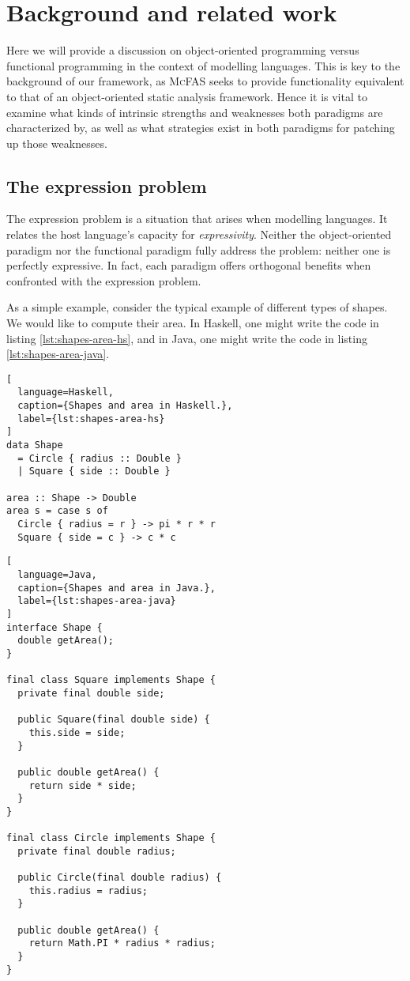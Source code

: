 \documentclass[letterpaper,11pt]{article}
\newcommand{\mcfas}{\textsc{McFAS}}
\begin{document}
\section{Background and related work}

Here we will provide a discussion on object-oriented programming versus
functional programming in the context of modelling languages. This is key to
the background of our framework, as \mcfas{} seeks to provide functionality
equivalent to that of an object-oriented static analysis framework. Hence it is
vital to examine what kinds of intrinsic strengths and weaknesses both
paradigms are characterized by, as well as what strategies exist in both
paradigms for patching up those weaknesses.

\subsection{The expression problem} \label{sec:expr}

The expression problem\cite{Wadler1998} is a situation that arises when
modelling languages. It relates the host language's capacity for
\emph{expressivity}. Neither the object-oriented paradigm nor the functional
paradigm fully address the problem: neither one is perfectly expressive. In
fact, each paradigm offers orthogonal benefits when confronted with the
expression problem.

As a simple example, consider the typical example of different types of shapes.
We would like to compute their area. In Haskell, one might write the code in
listing \ref{lst:shapes-area-hs}, and in Java, one might write the code in
listing \ref{lst:shapes-area-java}.

\begin{lstlisting}[
  language=Haskell,
  caption={Shapes and area in Haskell.},
  label={lst:shapes-area-hs}
]
data Shape
  = Circle { radius :: Double }
  | Square { side :: Double }

area :: Shape -> Double
area s = case s of
  Circle { radius = r } -> pi * r * r
  Square { side = c } -> c * c
\end{lstlisting}

\begin{lstlisting}[
  language=Java,
  caption={Shapes and area in Java.},
  label={lst:shapes-area-java}
]
interface Shape {
  double getArea();
}

final class Square implements Shape {
  private final double side;

  public Square(final double side) {
    this.side = side;
  }

  public double getArea() {
    return side * side;
  }
}

final class Circle implements Shape {
  private final double radius;

  public Circle(final double radius) {
    this.radius = radius;
  }

  public double getArea() {
    return Math.PI * radius * radius;
  }
}
\end{lstlisting}
\end{document}
